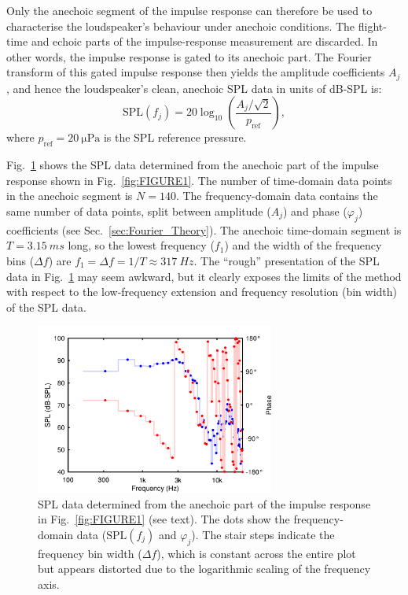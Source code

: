 \documentclass[12pt,a4paper]{article}
\providecommand{\secn}[1]{Sec.~\ref{sec:#1}}
\providecommand{\figlabel}[1]{\label{fig:#1}}
\providecommand{\figr}[1]{Fig.~\ref{fig:#1}}
\providecommand{\pRef}{p_\mathrm{ref}}
\begin{document}
Only the anechoic segment of the impulse response can therefore be used to characterise the loudspeaker’s behaviour under anechoic conditions. The flight-time and echoic parts of the impulse-response measurement are discarded. In other words, the impulse response is gated to its anechoic part. The Fourier transform of this gated impulse response then yields the amplitude coefficients $A_j$, and hence the loudspeaker’s clean, anechoic SPL data in units of dB-SPL is:
\[
\mathrm{SPL}(f_j) = 20 \log_{10}\left( \frac{A_j / \sqrt{2}}{\pRef} \right),
\]
where $\pRef = \SI{20}{\micro\pascal}$ is the SPL reference pressure.

\figr{FIGURE2} shows the SPL data determined from the anechoic part of the impulse response shown in \figr{FIGURE1}. The number of time-domain data points in the anechoic segment is $N = 140$. The frequency-domain data contains the same number of data points, split between amplitude ($A_j$) and phase ($\varphi_j$) coefficients (see \secn{Fourier_Theory}). The anechoic time-domain segment is $T = \SI{3.15}{ms}$ long, so the lowest frequency ($f_1$) and the width of the frequency bins ($\Delta f$) are $f_1 = \Delta f = 1/T \approx \SI{317}{Hz}$. The ``rough'' presentation of the SPL data in \figr{FIGURE2} may seem awkward, but it clearly exposes the limits of the method with respect to the low-frequency extension and frequency resolution (bin width) of the SPL data.

\begin{figure}[tbp]
  \begin{center}
    \includegraphics[width=0.7\textwidth]{FIGURE2}
    \caption{SPL data determined from the anechoic part of the impulse response in \figr{FIGURE1} (see text). The dots show the frequency-domain data ($\mathrm{SPL}(f_j)$ and $\varphi_j$). The stair steps indicate the frequency bin width ($\Delta f$), which is constant across the entire plot but appears distorted due to the logarithmic scaling of the frequency axis.}
    \figlabel{FIGURE2}
  \end{center}
\end{figure}
\end{document}
